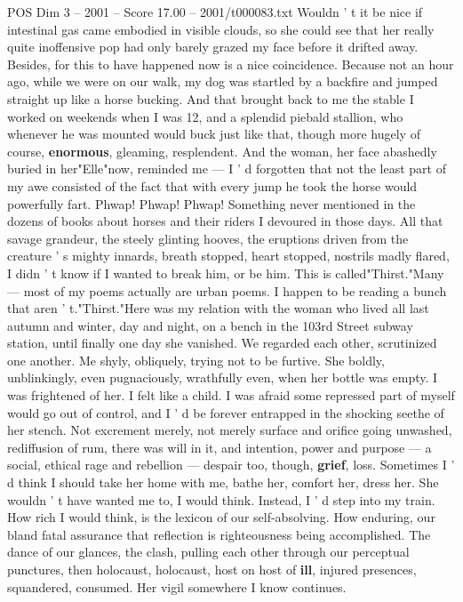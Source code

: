 \begin{textsample}{POS Dim 3 – 2001 – Score 17.00 – 2001/t000083.txt}
Wouldn ' t it be nice if intestinal gas came embodied in visible clouds, so she could see that her really quite inoffensive pop had only barely grazed my face before it drifted away.
Besides, for this to have happened now is a nice coincidence.
Because not an hour ago, while we were on our walk, my dog was startled by a backfire and jumped straight up like a horse bucking.
And that brought back to me the stable I worked on weekends when I was 12, and a splendid piebald stallion, who whenever he was mounted would buck just like that, though more hugely of course, \textbf{enormous}, gleaming, resplendent.
And the woman, her face abashedly buried in her"Elle"now, reminded me — I ' d forgotten that not the least part of my awe consisted of the fact that with every jump he took the horse would powerfully fart.
Phwap!
Phwap!
Phwap!
Something never mentioned in the dozens of books about horses and their riders I devoured in those days.
All that savage grandeur, the steely glinting hooves, the eruptions driven from the creature ' s mighty innards, breath stopped, heart stopped, nostrils madly flared, I didn ' t know if I wanted to break him, or be him.
This is called"Thirst."Many — most of my poems actually are urban poems.
I happen to be reading a bunch that aren ' t."Thirst."Here was my relation with the woman who lived all last autumn and winter, day and night, on a bench in the 103rd Street subway station, until finally one day she vanished.
We regarded each other, scrutinized one another.
Me shyly, obliquely, trying not to be furtive.
She boldly, unblinkingly, even pugnaciously, wrathfully even, when her bottle was empty.
I was frightened of her.
I felt like a child.
I was afraid some repressed part of myself would go out of control, and I ' d be forever entrapped in the shocking seethe of her stench.
Not excrement merely, not merely surface and orifice going unwashed, rediffusion of rum, there was will in it, and intention, power and purpose — a social, ethical rage and rebellion — despair too, though, \textbf{grief}, loss.
Sometimes I ' d think I should take her home with me, bathe her, comfort her, dress her.
She wouldn ' t have wanted me to, I would think.
Instead, I ' d step into my train.
How rich I would think, is the lexicon of our self-absolving.
How enduring, our bland fatal assurance that reflection is righteousness being accomplished.
The dance of our glances, the clash, pulling each other through our perceptual punctures, then holocaust, holocaust, host on host of \textbf{ill}, injured presences, squandered, consumed.
Her vigil somewhere I know continues.

\end{textsample}
